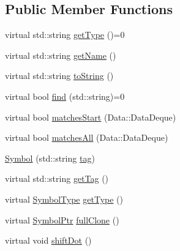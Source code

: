 \subsection*{Public Member Functions}
\begin{DoxyCompactItemize}
\item 
virtual std\+::string \mbox{\hyperlink{class_erable_1_1_compiler_1_1_symbols_1_1_symbol_a781d595ec8d14efcdbbf6d6123af1f50}{get\+Type}} ()=0
\item 
virtual std\+::string \mbox{\hyperlink{class_erable_1_1_compiler_1_1_symbols_1_1_symbol_a71aeae736d2ec43f0880341d53bbcc2c}{get\+Name}} ()
\item 
virtual std\+::string \mbox{\hyperlink{class_erable_1_1_compiler_1_1_symbols_1_1_symbol_ac133ad05913f81e836ae2f73815d1432}{to\+String}} ()
\item 
virtual bool \mbox{\hyperlink{class_erable_1_1_compiler_1_1_symbols_1_1_symbol_ac1d8b1392aef2e93bd47520a86f8617f}{find}} (std\+::string)=0
\item 
virtual bool \mbox{\hyperlink{class_erable_1_1_compiler_1_1_symbols_1_1_symbol_a108a4a3e9b9a2785f14ed580e813a52a}{matches\+Start}} (Data\+::\+Data\+Deque)
\item 
virtual bool \mbox{\hyperlink{class_erable_1_1_compiler_1_1_symbols_1_1_symbol_a49dd91010baf238ed0d639004c3ec9ba}{matches\+All}} (Data\+::\+Data\+Deque)
\item 
\mbox{\hyperlink{class_erable_1_1_compiler_1_1_symbols_1_1_symbol_ac4118dbed43e0a07dadb08f92bab3c75}{Symbol}} (std\+::string \mbox{\hyperlink{class_erable_1_1_compiler_1_1_symbols_1_1_symbol_a09df8dce9bee3576451b880fc651506d}{tag}})
\item 
virtual std\+::string \mbox{\hyperlink{class_erable_1_1_compiler_1_1_symbols_1_1_symbol_a135ecb3f3ede9d5c5804419da61716b5}{get\+Tag}} ()
\item 
virtual \mbox{\hyperlink{namespace_erable_1_1_compiler_1_1_symbols_a3b60ec10cda0920ec4368128361b8320}{Symbol\+Type}} \mbox{\hyperlink{class_erable_1_1_compiler_1_1_symbols_1_1_symbol_a23a0a77efd1cdab87aafdad87e4c22ba}{get\+Type}} ()
\item 
virtual \mbox{\hyperlink{namespace_erable_1_1_compiler_1_1_symbols_a8f0bc762f448ea4d84e8713ab3e140b9}{Symbol\+Ptr}} \mbox{\hyperlink{class_erable_1_1_compiler_1_1_symbols_1_1_symbol_a1d3750618449b2185abf49b891b3a61c}{full\+Clone}} ()
\item 
virtual void \mbox{\hyperlink{class_erable_1_1_compiler_1_1_symbols_1_1_symbol_a860610632433472ecf36faac39682c5e}{shift\+Dot}} ()

\end{DoxyCompactItemize}
